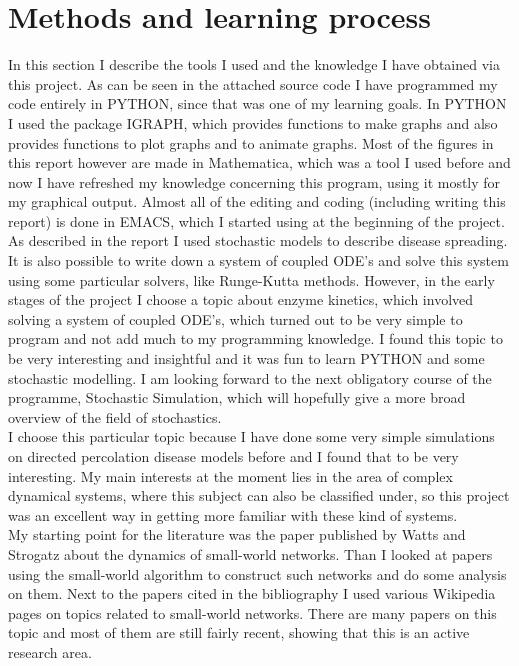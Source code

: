 \documentclass[10pt,a4paper]{article}
\begin{document}
\section{Methods and learning process}
In this section I describe the tools I used and the knowledge I have obtained via this project. As can be seen in the attached source code I have programmed my code entirely in PYTHON, since that was one of my learning goals. In PYTHON I used the package IGRAPH, which provides functions to make graphs and also provides functions to plot graphs and to animate graphs. Most of the figures in this report however are made in Mathematica, which was a tool I used before and now I have refreshed my knowledge concerning this program, using it mostly for my graphical output. Almost all of the editing and coding (including writing this report) is done in EMACS, which I started using at the beginning of the project.\\
As described in the report I used stochastic models to describe disease spreading. It is also possible to write down a system of coupled ODE's and solve this system using some particular solvers, like Runge-Kutta methods. However, in the early stages of the project I choose a topic about enzyme kinetics, which involved solving a system of coupled ODE's, which turned out to be very simple to program and not add much to my programming knowledge. I found this topic to be very interesting and insightful and it was fun to learn PYTHON and some stochastic modelling. I am looking forward to the next obligatory course of the programme, Stochastic Simulation, which will hopefully give a more broad overview of the field of stochastics.\\
I choose this particular topic because I have done some very simple simulations on directed percolation disease models before and I found that to be very interesting. My main interests at the moment lies in the area of complex dynamical systems, where this subject can also be classified under, so this project was an excellent way in getting more familiar with these kind of systems.\\
My starting point for the literature was the paper published by Watts and Strogatz about the dynamics of small-world networks. Than I looked at papers using the small-world algorithm to construct such networks and do some analysis on them. Next to the papers cited in the bibliography I used various Wikipedia pages on topics related to small-world networks. There are many papers on this topic and most of them are still fairly recent, showing that this is an active research area.
\end{document}
